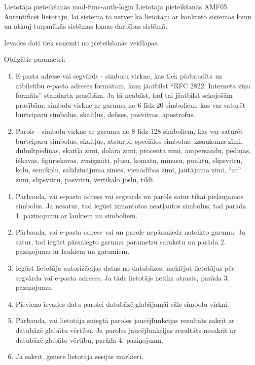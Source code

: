 \moduleFunctionTable
{Lietotāja pieteikšanās}
{mod-func-auth-login}
{Lietotāja pieteikšanās}
{AMF05}
{
	Autentificēt lietotāju, lai sistēma to uztver kā lietotāju ar konkrēto sistēmas lomu un atļauj turpmākās sistēmas lomas darbības sistēmā.
}
{
	Ievades dati tiek saņemti no pieteikšanās veidlapas.

	Obligātie parametri:
	\begin{enumerate}
		\item E-pasta adrese vai segvārds - simbolu virkne, kas tiek pārbaudīta uz atbilstību e-pasta adreses formātam, kam jāatbilst ``RFC 2822: Interneta ziņu formāts'' standarta prasībām.
		      Ja tā neabilst, tad tai jāatbilst sekojošām prasībām: simbolu virkne ar garumu no 6 līdz 20 simboliem, kas var saturēt burtciparu simbolus, skaitļus, defises, pasvītras, apostrofus.
		\item Parole - simbolu virkne ar garumu no 8 līdz 128 simboliem, kas var saturēt burtciparu simbolus, skaitļus, atstarpi, speciālos simbolus:
		      izsaukuma zīmi, dubultpēdiņas, skaitļa zīmi, dolāra zīmi, procenta zīmi, ampersandu, pēdiņas, iekavas, figūriekavas,
		      zvaigznīti, plusu, komatu, mīnusu, punktu, slīpsvītru, kolu, semikolu, salīdzinājuma zīmes, vienādības zīmi, jautājuma zīmi, ``at'' zīmi, slīpsvītru, pasvītru, vertikālo joslu, tildi.
	\end{enumerate}
}
{
	\begin{enumerate}
		\item Pārbauda, vai e-pasta adrese vai segvārds un parole satur tikai pieļaujamos simbolus.
		      Ja nesatur, tad iegūst izmantotos neatļautos simbolus, tad parāda 1. paziņojumu ar laukiem un simboliem.
		\item Pārbauda, vai e-pasta adrese vai un parole nepārsniedz noteikto garumu.
		      Ja satur, tad iegūst pārsniegto garumu parametru sarakstu un parāda 2. paziņojumu ar laukiem un garumiem.
		\item Iegūst lietotāja autorizācijas datus no datubāzes, meklējot lietotājus pēc segvārda vai e-pasta adreses.
		      Ja tāds lietotājs netika atrasts, parāda 3. paziņojumu.
		\item Pievieno ievades datu parolei datubāzē glabājamāi sāls simbolu virkni.
		\item Pārbauda, vai lietotāja sniegtā paroles jaucējfunkcijas rezultāts sakrīt ar datubāzē glabātu vērtību.
		      Ja paroles jaucējfunkcijas rezultāts nesakrīt ar datubāzē glabāto vērtību, parāda 4. paziņojumu.
		\item Ja sakrīt, ģenerē lietotāja sesijas marķieri.
	\end{enumerate}
}
